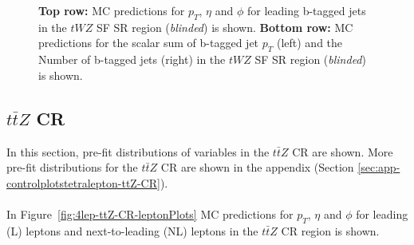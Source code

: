 \begin{figure}[htbp]
    \caption{\textbf{Top row:} MC predictions for $p_{T}$, $\eta$ and $\phi$ for leading b-tagged jets in the $tWZ$ SF SR region (\textit{blinded}) is shown. \textbf{Bottom row:} MC predictions for the scalar sum of b-tagged jet $p_{T}$ (left) and the Number of b-tagged jets (right) in the $tWZ$ SF SR region (\textit{blinded}) is shown.}
  \label{fig:4lep-SF-SR-bjetPlots}
\end{figure}

\subsection{$t\bar{t}Z$ CR}
\label{sec:controlplotstetralepton-ttZ-CR}


In this section, pre-fit distributions of variables in the $t\bar{t}Z$ CR are shown. More pre-fit distributions for the $t\bar{t}Z$ CR are shown in the appendix (Section \ref{sec:app-controlplotstetralepton-ttZ-CR}).\\\\

In Figure~\ref{fig:4lep-ttZ-CR-leptonPlots} MC predictions for $p_{T}$, $\eta$ and $\phi$ for leading (L) leptons and next-to-leading (NL) leptons in the $t\bar{t}Z$ CR region is shown.

